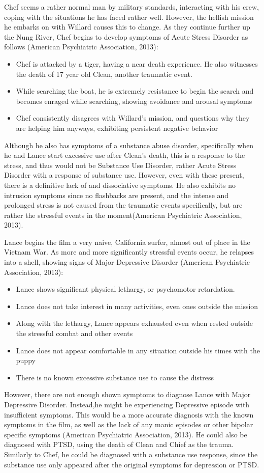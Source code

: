 \documentclass[a4paper,man,natbib]{apa6}
\begin{document}
Chef seems a rather normal man by military standards, interacting with his crew, coping with the situations he has faced rather well. However, the hellish mission he embarks on with Willard causes this to change. As they continue further up the Nung River, Chef begins to develop symptoms of Acute Stress Disorder as follows (American Psychiatric Association, 2013):
\begin{itemize}
\item Chef is attacked by a tiger, having a near death experience. He also witnesses the death of 17 year old Clean, another traumatic event.
\item While searching the boat, he is extremely resistance to begin the search and becomes enraged while searching, showing avoidance and arousal symptoms
\item Chef consistently disagrees with Willard's mission, and questions why they are helping him anyways, exhibiting persistent negative behavior
\end{itemize}
Although he also has symptoms of a substance abuse disorder, specifically when he and Lance start excessive use after Clean's death, this is a response to the stress, and thus would not be Substance Use Disorder, rather Acute Stress Disorder with a response of substance use. However, even with these present, there is a definitive lack of and dissociative symptoms. He also exhibits no intrusion symptoms since no flashbacks are present, and the intense and prolonged stress is not caused from the traumatic events specifically, but are rather the stressful events in the moment(American Psychiatric Association, 2013). 

Lance begins the film a very naive, California surfer, almost out of place in the Vietnam War. As more and more significantly stressful events occur, he relapses into a shell, showing signs of Major Depressive Disorder (American Psychiatric Association, 2013):
\begin{itemize}
\item Lance shows significant physical lethargy, or psychomotor retardation.
\item Lance does not take interest in many activities, even ones outside the mission
\item Along with the lethargy, Lance appears exhausted even when rested outside the stressful combat and other events
\item Lance does not appear comfortable in any situation outside his times with the puppy
\item There is no known excessive substance use to cause the distress
\end{itemize}
However, there are not enough shown symptoms to diagnose Lance with Major Depressive Disorder. Instead,he might be experiencing Depressive episode with insufficient symptoms. This would be a more accurate diagnosis with the known symptoms in the film, as well as the lack of any manic episodes or other bipolar specific symptoms (American Psychiatric Association, 2013). He could also be diagnosed with PTSD, using the death of Clean and Chief as the trauma. Similarly to Chef, he could be diagnosed with a substance use response, since the substance use only appeared after the original symptoms for depression or PTSD.
\end{document}
